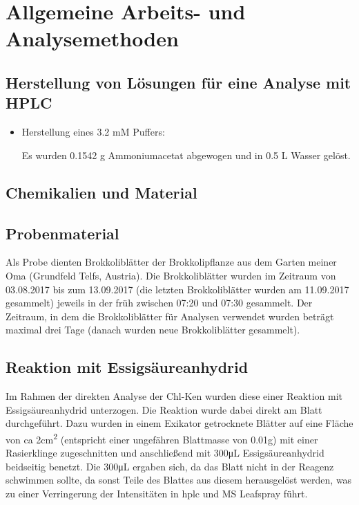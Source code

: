 \chapter{Allgemeine Arbeits- und Analysemethoden}

\section{Herstellung von Lösungen für eine Analyse mit HPLC}

\begin{itemize}
\item Herstellung eines 3.2 mM  Puffers:

Es wurden 0.1542 g Ammoniumacetat abgewogen und in 0.5 L Wasser gelöst.

\end{itemize}

\section{Chemikalien und Material}

\section{Probenmaterial}

Als Probe dienten Brokkoliblätter der Brokkolipflanze aus dem Garten meiner Oma (Grundfeld Telfs, Austria). Die Brokkoliblätter wurden im Zeitraum von 03.08.2017 bis zum 13.09.2017 (die letzten Brokkoliblätter wurden am 11.09.2017 gesammelt) jeweils in der früh zwischen 07:20 und 07:30 gesammelt. Der Zeitraum, in dem die Brokkoliblätter für Analysen verwendet wurden beträgt maximal drei Tage (danach wurden neue Brokkoliblätter gesammelt). \\

\section{Reaktion mit Essigsäureanhydrid}

Im Rahmen der direkten Analyse der \gls{Chl-K}en wurden diese einer Reaktion mit Essigsäureanhydrid unterzogen. Die Reaktion wurde dabei direkt am Blatt durchgeführt. Dazu wurden in einem Exikator getrocknete Blätter auf eine Fläche von \gls{ca} 2cm\textsuperscript{2} (entspricht einer ungefähren Blattmasse von 0.01g) mit einer Rasierklinge zugeschnitten und anschließend mit 300\si{\uL} Essigsäureanhydrid beidseitig benetzt. Die 300\si{\uL} ergaben sich, da das Blatt nicht in der Reagenz schwimmen sollte, da sonst Teile des Blattes aus diesem herausgelöst werden, was zu einer Verringerung der Intensitäten in \gls{hplc} und MS Leafspray führt. 

